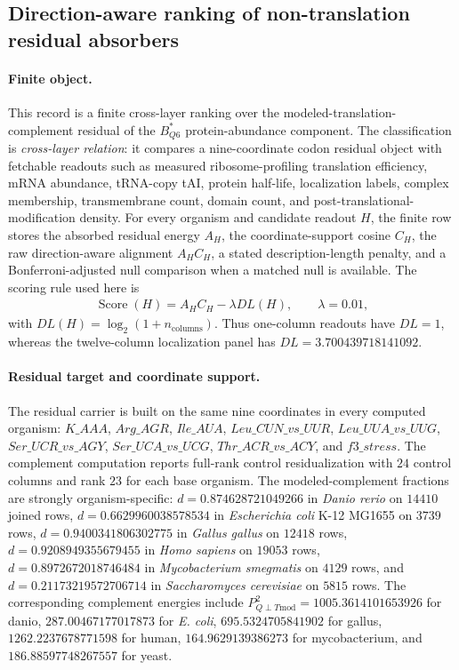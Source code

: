 \subsection{Direction-aware ranking of non-translation residual absorbers}
\label{sec:q6-h-ranking-table-direction-aware-cross-layer}

\paragraph{Finite object.}
This record is a finite cross-layer ranking over the modeled-translation-complement residual of the $B^\ast_{Q6}$ protein-abundance component.  The classification is \emph{cross-layer relation}: it compares a nine-coordinate codon residual object with fetchable readouts such as measured ribosome-profiling translation efficiency, mRNA abundance, tRNA-copy tAI, protein half-life, localization labels, complex membership, transmembrane count, domain count, and post-translational-modification density.  For every organism and candidate readout $H$, the finite row stores the absorbed residual energy $A_H$, the coordinate-support cosine $C_H$, the raw direction-aware alignment $A_H C_H$, a stated description-length penalty, and a Bonferroni-adjusted null comparison when a matched null is available.  The scoring rule used here is
$$
\begin{aligned}
\operatorname{Score}(H) = A_H C_H - \lambda DL(H), \qquad \lambda = 0.01,
\end{aligned}
$$
with $DL(H)=\log_2(1+n_{\mathrm{columns}})$.  Thus one-column readouts have $DL=1$, whereas the twelve-column localization panel has $DL=3.700439718141092$.

\paragraph{Residual target and coordinate support.}
The residual carrier is built on the same nine coordinates in every computed organism: $K\_AAA$, $Arg\_AGR$, $Ile\_AUA$, $Leu\_CUN\_vs\_UUR$, $Leu\_UUA\_vs\_UUG$, $Ser\_UCR\_vs\_AGY$, $Ser\_UCA\_vs\_UCG$, $Thr\_ACR\_vs\_ACY$, and $f3\_stress$.  The complement computation reports full-rank control residualization with $24$ control columns and rank $23$ for each base organism.  The modeled-complement fractions are strongly organism-specific: $d=0.874628721049266$ in \emph{Danio rerio} on $14410$ joined rows, $d=0.6629960038578534$ in \emph{Escherichia coli} K-12 MG1655 on $3739$ rows, $d=0.9400341806302775$ in \emph{Gallus gallus} on $12418$ rows, $d=0.9208949355679455$ in \emph{Homo sapiens} on $19053$ rows, $d=0.8972672018746484$ in \emph{Mycobacterium smegmatis} on $4129$ rows, and $d=0.21173219572706714$ in \emph{Saccharomyces cerevisiae} on $5815$ rows.  The corresponding complement energies include $P_{Q\perp T\mathrm{mod}}^2=1005.3614101653926$ for danio, $287.00467177017873$ for \emph{E. coli}, $695.5324705841902$ for gallus, $1262.2237678771598$ for human, $164.9629139386273$ for mycobacterium, and $186.88597748267557$ for yeast.

